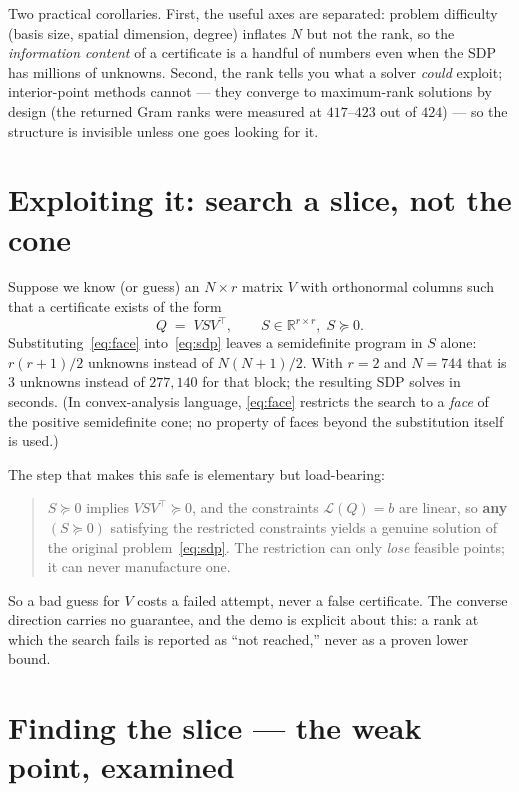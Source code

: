 \documentclass[11pt]{article}
\newcommand{\R}{\mathbb{R}}
\begin{document}
Two practical corollaries. First, the useful axes are separated: problem
difficulty (basis size, spatial dimension, degree) inflates $N$ but not the
rank, so the \emph{information content} of a certificate is a handful of
numbers even when the SDP has millions of unknowns. Second, the rank tells
you what a solver \emph{could} exploit; interior-point methods cannot ---
they converge to maximum-rank solutions by design (the returned Gram ranks
were measured at $417$--$423$ out of $424$) --- so the structure is invisible
unless one goes looking for it.

\section{Exploiting it: search a slice, not the cone}

Suppose we know (or guess) an $N\times r$ matrix $V$ with orthonormal columns
such that a certificate exists of the form
\begin{equation}\label{eq:face}
Q \;=\; V S V^{\top}, \qquad S\in\R^{r\times r},\; S\succeq 0 .
\end{equation}
Substituting~\eqref{eq:face} into~\eqref{eq:sdp} leaves a semidefinite
program in $S$ alone: $r(r+1)/2$ unknowns instead of $N(N+1)/2$. With
$r=2$ and $N=744$ that is $3$ unknowns instead of $277{,}140$ for that block; the resulting
SDP solves in seconds. (In convex-analysis language, \eqref{eq:face}
restricts the search to a \emph{face} of the positive semidefinite cone; no
property of faces beyond the substitution itself is used.)

The step that makes this safe is elementary but load-bearing:
\begin{quote}
$S\succeq0$ implies $VSV^{\top}\succeq0$, and the constraints
$\mathcal{L}(Q)=b$ are linear, so \textbf{any} $(S\succeq0)$ satisfying the
restricted constraints yields a genuine solution of the original
problem~\eqref{eq:sdp}. The restriction can only \emph{lose} feasible points;
it can never manufacture one.
\end{quote}
So a bad guess for $V$ costs a failed attempt, never a false certificate.
The converse direction carries no guarantee, and the demo is explicit about
this: a rank at which the search fails is reported as ``not reached,'' never
as a proven lower bound.

\section{Finding the slice --- the weak point, examined}\label{sec:bm}
\end{document}
